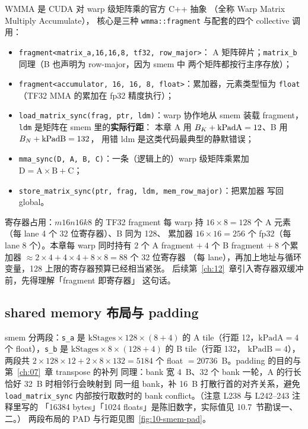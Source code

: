 WMMA 是 CUDA 对 warp 级矩阵乘的官方 C++ 抽象
（全称 Warp Matrix Multiply Accumulate），
核心是三种 \texttt{wmma::\allowbreak{}fragment} 与配套的四个 collective 调用：
\begin{itemize}
  \item \texttt{fragment\allowbreak{}<matrix\_\allowbreak{}a,\allowbreak{}16,\allowbreak{}16,\allowbreak{}8,\allowbreak{} tf32,\allowbreak{} row\_\allowbreak{}major>}：
        A 矩阵碎片；\texttt{matrix\_b} 同理（B 也声明为 row-major，因为 smem 中
        两个矩阵都按行主序存放）；
  \item \texttt{fragment\allowbreak{}<accumulator,\allowbreak{} 16,\allowbreak{} 16,\allowbreak{} 8,\allowbreak{} float>}：累加器，元素类型恒为
        \texttt{float}（TF32 MMA 的累加在 fp32 精度执行）；
  \item \texttt{load\_\allowbreak{}matrix\_\allowbreak{}sync\allowbreak{}(frag,\allowbreak{} ptr,\allowbreak{} ldm)}：warp 协作地从 smem 装载
        fragment，\texttt{ldm} 是矩阵在 smem 里的\textbf{实际行距}：
        本章 A 用 $B\sb K + \mathrm{kPadA} = 12$、B 用 $B\sb N + \mathrm{kPadB} = 132$，
        用错 ldm 是这类代码最典型的静默错误；
  \item \texttt{mma\_sync(D, A, B, C)}：一条（逻辑上的）warp 级矩阵乘累加
        $\mathrm{D} = \mathrm{A}\times\mathrm{B} + \mathrm{C}$；
  \item \texttt{store\_\allowbreak{}matrix\_\allowbreak{}sync\allowbreak{}(ptr,\allowbreak{} frag,\allowbreak{} ldm,\allowbreak{} mem\_\allowbreak{}row\_\allowbreak{}major)}：把累加器
        写回 global。
\end{itemize}
寄存器占用：$m16n16k8$ 的 TF32 fragment 每 warp 持
$16\times8 = 128$ 个 A 元素（每 lane 4 个 32 位寄存器）、B 同为 128、
累加器 $16\times16 = 256$ 个 fp32（每 lane 8 个）。本章每 warp 同时持有
$2$ 个 A fragment $+\ 4$ 个 B fragment $+\ 8$ 个累加器
$\approx 2{\times}4 + 4{\times}4 + 8{\times}8 = 88$ 个 32 位寄存器
（每 lane），再加上地址与循环变量，128 上限的寄存器预算已经相当紧张。
后续第~\ref{ch:12}~章引入寄存器双缓冲前，先得理解「fragment 即寄存器」
这句话。

\subsection{shared memory 布局与 padding}



smem 分两段：\texttt{s\_a} 是 $\mathrm{kStages}\times 128\times(8+4)$ 的
A tile（行距 12，$\mathrm{kPadA}=4$ 个 float），\texttt{s\_b} 是
$\mathrm{kStages}\times 8\times(128+4)$ 的 B tile（行距 132，
$\mathrm{kPadB}=4$），两段共 $2\times128\times12 + 2\times8\times132 = 5184$
个 float $= 20736$~B。padding 的目的与第~\ref{ch:07}~章 transpose 的补列
同理：bank 宽 4~B、32 个 bank 一轮，A 的行长恰好 32~B 时相邻行会映射到
同一组 bank，补 16~B 打散行首的对齐关系，避免 \texttt{load\_\allowbreak{}matrix\_\allowbreak{}sync}
内部按行取数时的 bank conflict。（注意 L238 与 L242--243 注释里写的
「16384 bytes」「1024 floats」是陈旧数字，实际值见 10.7~节勘误一、二。）
两段布局的 PAD 与行距见图~\ref{fig:10-smem-pad}。

